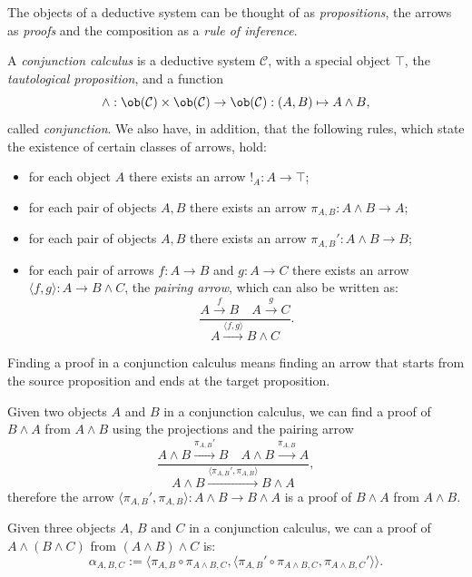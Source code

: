 The objects of a deductive system can be thought of as \textit{propositions}, the arrows as \textit{proofs} and the composition as a \textit{rule of inference}.

\begin{definition}
    A \textit{conjunction calculus} is a deductive system $\mathcal C$, with a special object $\top$, the \textit{tautological proposition}, and a function
    \[ \wedge : \ob(\mathcal C)\times\ob(\mathcal C) \to \ob(\mathcal C) : (A,B) \mapsto A\wedge B, \]
    called \textit{conjunction}. We also have, in addition, that the following rules, which state the existence of certain classes of arrows, hold:
    \begin{itemize}
        \item[(\textnormal{Conj 1})] for each object $A$ there exists an arrow $!_A : A \to \top$;
        \item[(\textnormal{Conj 2a})] for each pair of objects $A,B$ there exists an arrow $\pi_{A,B} : A \wedge B \to A$;
        \item[(\textnormal{Conj 2b})] for each pair of objects $A,B$ there exists an arrow $\pi_{A,B}' : A \wedge B \to B$;
        \item[(\textnormal{Conj 2c})] for each pair of arrows $f : A \to B$ and $g : A \to C$ there exists an arrow $\langle f,g\rangle : A \to B \wedge C$, the \textit{pairing arrow}, which can also be written as:
        \[ \frac{A \xrightarrow{f} B \quad A \xrightarrow{g} C}{A \xrightarrow{\langle f,g\rangle} B \wedge C}.
        \]
    \end{itemize}
\end{definition}

Finding a proof in a conjunction calculus means finding an arrow that starts from the source proposition and ends at the target proposition.

\begin{example}
    Given two objects $A$ and $B$ in a conjunction calculus, we can find a proof of $B \land A$ from $A \land B$ using the projections and the pairing arrow
    \[ \frac{A \wedge B \xrightarrow{\pi_{A,B}'} B \quad A \wedge B \xrightarrow{\pi_{A,B}} A}{A \wedge B \xrightarrow{\langle \pi_{A,B}',\pi_{A,B}\rangle} B \wedge A}, \]
    therefore the arrow $\langle \pi_{A,B}',\pi_{A,B}\rangle : A \wedge B \to B \wedge A$ is a proof of $B \land A$ from $A \land B$.
\end{example}

\begin{example}\label{ex:associativity-of-conjunction}
    Given three objects $A$, $B$ and $C$ in a conjunction calculus, we can a proof of $A \land (B \land C)$ from $(A \land B) \land C$ is:
    \[ \alpha_{A,B,C} := \langle \pi_{A,B}\circ \pi_{A \land B,C}, \langle \pi_{A,B}'\circ \pi_{A \land B,C}, \pi_{A \land B,C}'\rangle\rangle. \]
\end{example}

